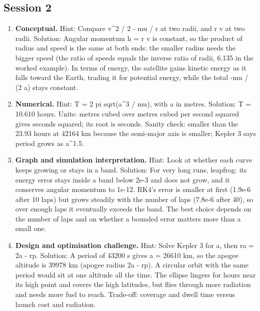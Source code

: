 \documentclass[11pt,a4paper]{article}
\begin{document}
\subsection*{Session 2}
\begin{enumerate}[nosep]
\item \textbf{Conceptual.} Hint: Compare v\textasciicircum{}2 / 2 - mu / r at two radii, and r v at two radii. Solution: Angular momentum h = r v is constant, so the product of radius and speed is the same at both ends: the smaller radius needs the bigger speed (the ratio of speeds equals the inverse ratio of radii, 6.135 in the worked example). In terms of energy, the satellite gains kinetic energy as it falls toward the Earth, trading it for potential energy, while the total -mu / (2 a) stays constant.
\item \textbf{Numerical.} Hint: T = 2 pi sqrt(a\textasciicircum{}3 / mu), with a in metres. Solution: T = 10.610 hours. Units: metres cubed over metres cubed per second squared gives seconds squared; its root is seconds. Sanity check: smaller than the 23.93 hours at 42164 km because the semi-major axis is smaller; Kepler 3 says period grows as a\textasciicircum{}1.5.
\item \textbf{Graph and simulation interpretation.} Hint: Look at whether each curve keeps growing or stays in a band. Solution: For very long runs, leapfrog: its energy error stays inside a band below 2e-3 and does not grow, and it conserves angular momentum to 1e-12. RK4's error is smaller at first (1.9e-6 after 10 laps) but grows steadily with the number of laps (7.8e-6 after 40), so over enough laps it eventually exceeds the band. The best choice depends on the number of laps and on whether a bounded error matters more than a small one.
\item \textbf{Design and optimisation challenge.} Hint: Solve Kepler 3 for a, then ra = 2a - rp. Solution: A period of 43200 s gives a = 26610 km, so the apogee altitude is 39978 km (apogee radius 2a - rp). A circular orbit with the same period would sit at one altitude all the time. The ellipse lingers for hours near its high point and covers the high latitudes, but flies through more radiation and needs more fuel to reach. Trade-off: coverage and dwell time versus launch cost and radiation.
\end{enumerate}
\end{document}
